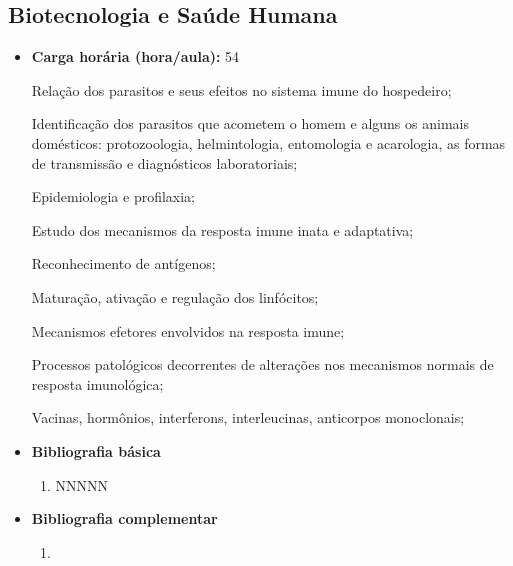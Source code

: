 \documentclass[11pt,fleqn]{book} %
\begin{document}
\subsection{Biotecnologia e Saúde Humana}\label{disc:biotecSaude}
\begin{itemize}
	\item \textbf{Carga horária (hora/aula):} 54
	
	Relação dos parasitos e seus efeitos no sistema imune do hospedeiro; 
	
	Identificação dos parasitos que acometem o homem e alguns os animais domésticos: protozoologia, helmintologia, entomologia e acarologia, as formas de transmissão e diagnósticos laboratoriais; 
	
	Epidemiologia e profilaxia; 
	
	Estudo dos mecanismos da resposta imune inata e adaptativa; 
	
	Reconhecimento de antígenos; 
	
	Maturação, ativação e regulação dos linfócitos;
	
	Mecanismos efetores envolvidos na resposta imune;
	
	Processos patológicos decorrentes de alterações nos mecanismos normais de resposta imunológica;
	
	Vacinas, hormônios, interferons, interleucinas, anticorpos monoclonais;
	
	\item \textbf{Bibliografia básica}
	\begin{enumerate}
		\item NNNNN
	\end{enumerate}
	\item \textbf{Bibliografia complementar}
	\begin{enumerate}
		\item 
	\end{enumerate}	
\end{itemize}


\newpage
\end{document}
